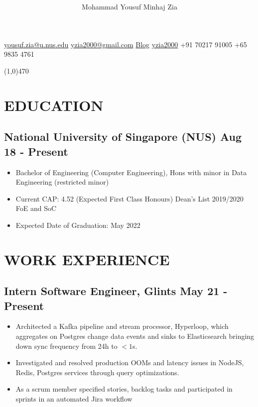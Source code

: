 \documentclass[12pts]{article}
\date{\vspace{-5ex}}
\title{\vspace{-5ex} \vspace{-5ex}}
\author{\Huge Mohammad Yousuf Minhaj Zia}
\begin{document}
\maketitle

\centerline{
\href{mailto:yousuf.zia@u.nus.edu}{yousuf.zia@u.nus.edu} \textbar \hspace{1pt}
\href{mailto:yzia2000@gmail.com}{yzia2000@gmail.com} \textbar \hspace{1pt} 
\href{https://yzia2000.github.io/blog}{Blog} \textbar \hspace{1pt} 
\href{https://github.com/yzia2000}{\faGithub \hspace{1pt} yzia2000} \textbar \hspace{1pt}
\href{https://www.linkedin.com/in/mohammad-yousuf-minhaj-zia-ab555396}{\faLinkedin} \textbar \hspace{1pt}
+91 70217 91005 \textbar \hspace{1pt} 
+65 9835 4761 
}

\line(1,0){470}\\

\section*{EDUCATION}
\subsection*{National University of Singapore (NUS) \hfill Aug 18 - Present}
\begin{itemize}
    \item Bachelor of Engineering (Computer Engineering), Hons with minor in Data Engineering (restricted minor)
    \item Current CAP: 4.52 (Expected First Class Honours) Dean's List 2019/2020 FoE and SoC
    \item Expected Date of Graduation: May 2022
\end{itemize}

\section*{WORK EXPERIENCE}
\subsection*{Intern Software Engineer, Glints \hfill May 21 - Present}
\begin{itemize}
    \item Architected a Kafka pipeline and stream processor, Hyperloop, which aggregates on Postgres change data events and sinks to Elasticsearch bringing down sync frequency from 24h to $<1$s.
    \item Investigated and resolved production OOMs and latency issues in NodeJS, Redis, Postgres services through query optimizations.
    \item As a scrum member specified stories, backlog tasks and participated in sprints in an automated Jira workflow
\end{itemize}
\end{document}
